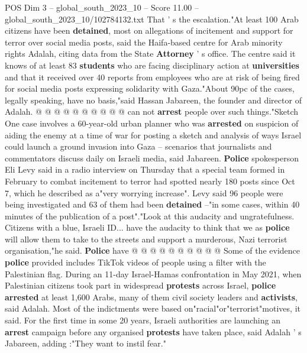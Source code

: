 \begin{textsample}{POS Dim 3 – global\_south\_2023\_10 – Score 11.00 – global\_south\_2023\_10/102784132.txt}
That ' s the escalation."At least 100 Arab citizens have been \textbf{detained}, most on allegations of incitement and support for terror over social media posts, said the Haifa-based centre for Arab minority rights Adalah, citing data from the State \textbf{Attorney} ' s office.
The centre said it knows of at least 83 \textbf{students} who are facing disciplinary action at \textbf{universities} and that it received over 40 reports from employees who are at risk of being fired for social media posts expressing solidarity with Gaza."About 90pc of the cases, legally speaking, have no basis,"said Hassan Jabareen, the founder and director of Adalah. @ @ @ @ @ @ @ @ @ @ can not \textbf{arrest} people over such things."Sketch One case involves a 60-year-old urban planner who was \textbf{arrested} on suspicion of aiding the enemy at a time of war for posting a sketch and analysis of ways Israel could launch a ground invasion into Gaza -- scenarios that journalists and commentators discuss daily on Israeli media, said Jabareen. \textbf{Police} spokesperson Eli Levy said in a radio interview on Thursday that a special team formed in February to combat incitement to terror had spotted nearly 180 posts since Oct 7, which he described as a"very worrying increase".
Levy said 96 people were being investigated and 63 of them had been \textbf{detained} --"in some cases, within 40 minutes of the publication of a post"."Look at this audacity and ungratefulness.
Citizens with a blue, Israeli ID... have the audacity to think that we as \textbf{police} will allow them to take to the streets and support a murderous, Nazi terrorist organisation,"he said. \textbf{Police} have @ @ @ @ @ @ @ @ @ @ Some of the evidence \textbf{police} provided includes TikTok videos of people using a filter with the Palestinian flag.
During an 11-day Israel-Hamas confrontation in May 2021, when Palestinian citizens took part in widespread \textbf{protests} across Israel, \textbf{police} \textbf{arrested} at least 1,600 Arabs, many of them civil society leaders and \textbf{activists}, said Adalah.
Most of the indictments were based on"racial"or"terrorist"motives, it said.
For the first time in some 20 years, Israeli authorities are launching an \textbf{arrest} campaign before any organised \textbf{protests} have taken place, said Adalah ' s Jabareen, adding :"They want to instil fear."

\end{textsample}
